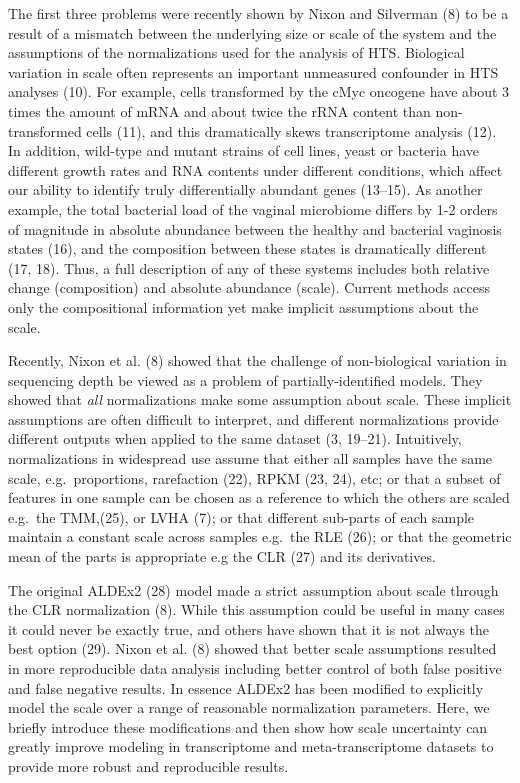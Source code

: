 \documentclass[
]{article}
\begin{document}
The first three problems were recently shown by Nixon and Silverman (8)
to be a result of a mismatch between the underlying size or scale of the
system and the assumptions of the normalizations used for the analysis
of HTS. Biological variation in scale often represents an important
unmeasured confounder in HTS analyses (10). For example, cells
transformed by the cMyc oncogene have about 3 times the amount of mRNA
and about twice the rRNA content than non-transformed cells (11), and
this dramatically skews transcriptome analysis (12). In addition,
wild-type and mutant strains of cell lines, yeast or bacteria have
different growth rates and RNA contents under different conditions,
which affect our ability to identify truly differentially abundant genes
(13--15). As another example, the total bacterial load of the vaginal
microbiome differs by 1-2 orders of magnitude in absolute abundance
between the healthy and bacterial vaginosis states (16), and the
composition between these states is dramatically different (17, 18).
Thus, a full description of any of these systems includes both relative
change (composition) and absolute abundance (scale). Current methods
access only the compositional information yet make implicit assumptions
about the scale.

Recently, Nixon et al. (8) showed that the challenge of non-biological
variation in sequencing depth be viewed as a problem of
partially-identified models. They showed that \emph{all} normalizations
make some assumption about scale. These implicit assumptions are often
difficult to interpret, and different normalizations provide different
outputs when applied to the same dataset (3, 19--21). Intuitively,
normalizations in widespread use assume that either all samples have the
same scale, e.g.~proportions, rarefaction (22), RPKM (23, 24), etc; or
that a subset of features in one sample can be chosen as a reference to
which the others are scaled e.g.~the TMM,(25), or LVHA (7); or that
different sub-parts of each sample maintain a constant scale across
samples e.g.~the RLE (26); or that the geometric mean of the parts is
appropriate e.g the CLR (27) and its derivatives.

The original ALDEx2 (28) model made a strict assumption about scale
through the CLR normalization (8). While this assumption could be useful
in many cases it could never be exactly true, and others have shown that
it is not always the best option (29). Nixon et al. (8) showed that
better scale assumptions resulted in more reproducible data analysis
including better control of both false positive and false negative
results. In essence ALDEx2 has been modified to explicitly model the
scale over a range of reasonable normalization parameters. Here, we
briefly introduce these modifications and then show how scale
uncertainty can greatly improve modeling in transcriptome and
meta-transcriptome datasets to provide more robust and reproducible
results.
\end{document}

